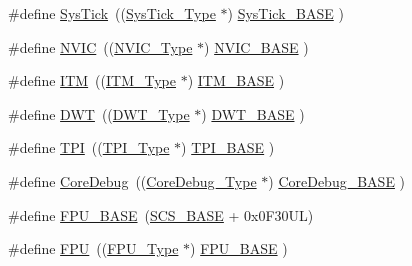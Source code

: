 \begin{DoxyCompactItemize}
\item 
\#define \mbox{\hyperlink{group___c_m_s_i_s__core__base_gacd96c53beeaff8f603fcda425eb295de}{Sys\+Tick}}~((\mbox{\hyperlink{struct_sys_tick___type}{Sys\+Tick\+\_\+\+Type}}   $\ast$)     \mbox{\hyperlink{group___c_m_s_i_s__core__base_ga58effaac0b93006b756d33209e814646}{Sys\+Tick\+\_\+\+B\+A\+SE}}     )
\item 
\#define \mbox{\hyperlink{group___c_m_s_i_s__core__base_gac8e97e8ce56ae9f57da1363a937f8a17}{N\+V\+IC}}~((\mbox{\hyperlink{struct_n_v_i_c___type}{N\+V\+I\+C\+\_\+\+Type}}      $\ast$)     \mbox{\hyperlink{group___c_m_s_i_s__core__base_gaa0288691785a5f868238e0468b39523d}{N\+V\+I\+C\+\_\+\+B\+A\+SE}}        )
\item 
\#define \mbox{\hyperlink{group___c_m_s_i_s__core__base_gabae7cdf882def602cb787bb039ff6a43}{I\+TM}}~((\mbox{\hyperlink{struct_i_t_m___type}{I\+T\+M\+\_\+\+Type}}       $\ast$)     \mbox{\hyperlink{group___c_m_s_i_s__core__base_gadd76251e412a195ec0a8f47227a8359e}{I\+T\+M\+\_\+\+B\+A\+SE}}         )
\item 
\#define \mbox{\hyperlink{group___c_m_s_i_s__core__base_gabbe5a060185e1d5afa3f85b14e10a6ce}{D\+WT}}~((\mbox{\hyperlink{struct_d_w_t___type}{D\+W\+T\+\_\+\+Type}}       $\ast$)     \mbox{\hyperlink{group___c_m_s_i_s__core__base_gafdab534f961bf8935eb456cb7700dcd2}{D\+W\+T\+\_\+\+B\+A\+SE}}         )
\item 
\#define \mbox{\hyperlink{group___c_m_s_i_s__core__base_ga8b4dd00016aed25a0ea54e9a9acd1239}{T\+PI}}~((\mbox{\hyperlink{struct_t_p_i___type}{T\+P\+I\+\_\+\+Type}}       $\ast$)     \mbox{\hyperlink{group___c_m_s_i_s__core__base_ga2b1eeff850a7e418844ca847145a1a68}{T\+P\+I\+\_\+\+B\+A\+SE}}         )
\item 
\#define \mbox{\hyperlink{group___c_m_s_i_s__core__base_gab6e30a2b802d9021619dbb0be7f5d63d}{Core\+Debug}}~((\mbox{\hyperlink{struct_core_debug___type}{Core\+Debug\+\_\+\+Type}} $\ast$)     \mbox{\hyperlink{group___c_m_s_i_s__core__base_ga680604dbcda9e9b31a1639fcffe5230b}{Core\+Debug\+\_\+\+B\+A\+SE}}   )
\item 
\#define \mbox{\hyperlink{group___c_m_s_i_s__core__base_ga4dcad4027118c098c07bcd575f1fbb28}{F\+P\+U\+\_\+\+B\+A\+SE}}~(\mbox{\hyperlink{group___c_m_s_i_s__core__base_ga3c14ed93192c8d9143322bbf77ebf770}{S\+C\+S\+\_\+\+B\+A\+SE}} +  0x0\+F30\+U\+L)
\item 
\#define \mbox{\hyperlink{group___c_m_s_i_s__core__base_gabc7c93f2594e85ece1e1a24f10591428}{F\+PU}}~((\mbox{\hyperlink{struct_f_p_u___type}{F\+P\+U\+\_\+\+Type}}       $\ast$)     \mbox{\hyperlink{group___c_m_s_i_s__core__base_ga4dcad4027118c098c07bcd575f1fbb28}{F\+P\+U\+\_\+\+B\+A\+SE}}         )

\end{DoxyCompactItemize}
